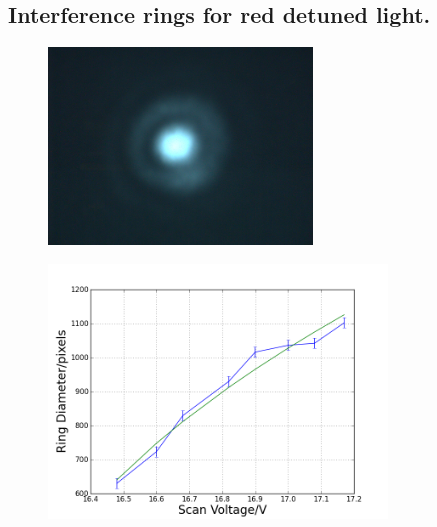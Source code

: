 \documentclass[aps,twocolumn,secnumarabic,balancelastpage,amsmath,amssymb,nofootinbib]{revtex4}
\begin{document}
\subsection{Interference rings for red detuned light.}
\begin{figure}
  \includegraphics[width=7cm]{rings.png}
  \caption{}
  \label{rings}
\end{figure}
\begin{figure}
  \includegraphics[width=9cm]{../data/5-16/ring-fit.png}
  \caption{}
  \label{ring_fit}
\end{figure}
\end{document}
